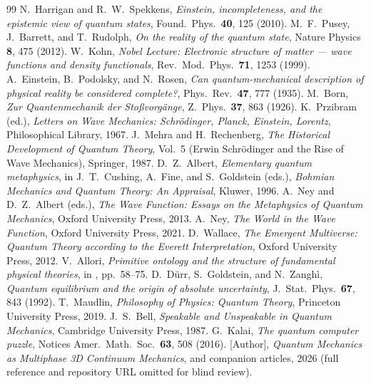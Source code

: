 \documentclass[11pt]{article}
\begin{document}
\begin{thebibliography}{99}
 N.~Harrigan and R.~W.~Spekkens, \emph{Einstein, incompleteness, and the epistemic view
of quantum states}, Found.\ Phys.\ \textbf{40}, 125 (2010).
 M.~F.~Pusey, J.~Barrett, and T.~Rudolph, \emph{On the reality of the quantum state}, Nature
Physics \textbf{8}, 475 (2012).
 W.~Kohn, \emph{Nobel Lecture: Electronic structure of matter --- wave functions and density
functionals}, Rev.\ Mod.\ Phys.\ \textbf{71}, 1253 (1999).
 A.~Einstein, B.~Podolsky, and N.~Rosen, \emph{Can quantum-mechanical description of physical
reality be considered complete?}, Phys.\ Rev.\ \textbf{47}, 777 (1935).
 M.~Born, \emph{Zur Quantenmechanik der Sto\ss vorg\"ange}, Z.\ Phys.\ \textbf{37}, 863 (1926).
 K.~Przibram (ed.), \emph{Letters on Wave Mechanics: Schr\"odinger, Planck, Einstein,
Lorentz}, Philosophical Library, 1967.
 J.~Mehra and H.~Rechenberg, \emph{The Historical Development of Quantum Theory},
Vol.~5 (Erwin Schr\"odinger and the Rise of Wave Mechanics), Springer, 1987.
 D.~Z.~Albert, \emph{Elementary quantum metaphysics}, in J.~T.~Cushing, A.~Fine, and S.~Goldstein
(eds.), \emph{Bohmian Mechanics and Quantum Theory: An Appraisal}, Kluwer, 1996.
 A.~Ney and D.~Z.~Albert (eds.), \emph{The Wave Function: Essays on the Metaphysics of Quantum
Mechanics}, Oxford University Press, 2013.
 A.~Ney, \emph{The World in the Wave Function}, Oxford University Press, 2021.
 D.~Wallace, \emph{The Emergent Multiverse: Quantum Theory according to the Everett
Interpretation}, Oxford University Press, 2012.
 V.~Allori, \emph{Primitive ontology and the structure of fundamental physical theories}, in
\cite{NeyAlbert}, pp.~58--75.
 D.~D\"urr, S.~Goldstein, and N.~Zangh\`i, \emph{Quantum equilibrium and the origin of absolute
uncertainty}, J.\ Stat.\ Phys.\ \textbf{67}, 843 (1992).
 T.~Maudlin, \emph{Philosophy of Physics: Quantum Theory}, Princeton University Press, 2019.
 J.~S.~Bell, \emph{Speakable and Unspeakable in Quantum Mechanics}, Cambridge University Press,
1987.
 G.~Kalai, \emph{The quantum computer puzzle}, Notices Amer.\ Math.\ Soc.\ \textbf{63}, 508
(2016).
 [Author], \emph{Quantum Mechanics as Multiphase 3D Continuum Mechanics}, and companion articles, 2026 (full reference and repository URL omitted for blind review).
\end{thebibliography}
\end{document}
